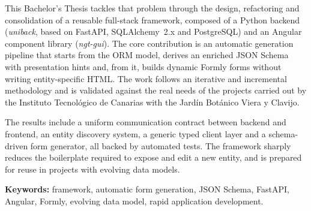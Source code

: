{This Bachelor's Thesis tackles that problem through the design, refactoring and
consolidation of a reusable full-stack framework, composed of a Python backend
(\emph{uniback}, based on FastAPI, SQLAlchemy~2.x and PostgreSQL) and an
Angular component library (\emph{ngt-gui}). The core contribution is an
automatic generation pipeline that starts from the ORM model, derives an
enriched JSON Schema with presentation hints and, from it, builds dynamic
Formly forms without writing entity-specific HTML. The work follows an
iterative and incremental methodology and is validated against the real needs
of the projects carried out by the Instituto Tecnológico de Canarias with the
Jardín Botánico Viera y Clavijo.

The results include a uniform communication contract between backend and
frontend, an entity discovery system, a generic typed client layer and a
schema-driven form generator, all backed by automated tests. The framework
sharply reduces the boilerplate required to expose and edit a new entity, and
is prepared for reuse in projects with evolving data models.

\textbf{Keywords:} framework, automatic form generation, JSON Schema, FastAPI,
Angular, Formly, evolving data model, rapid application development.

}
